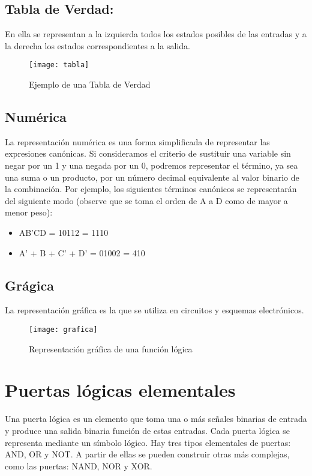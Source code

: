 \documentclass{article}
\begin{document}
            \subsection{\textbf{Tabla de Verdad:}} 
                En ella se representan a la izquierda todos los estados posibles de las entradas y a la derecha los estados correspondientes a la salida.\\
                \begin{figure}[htp]
                \centering
                \texttt{[image: tabla]}
                \caption{Ejemplo de una Tabla de Verdad}
                \end{figure}
             \subsection{\textbf{Numérica}}
                La representación numérica es una forma simplificada de representar las expresiones canónicas. Si consideramos el criterio de sustituir una variable sin negar por un 1 y una negada por un 0, podremos representar el término, ya sea una suma o un producto, por un número decimal equivalente al valor binario de la combinación. Por ejemplo, los siguientes términos canónicos se representarán del siguiente modo (observe que se toma el orden de A a D como de mayor a menor peso):\\
                \begin{itemize}
                \item AB’CD = 10112 = 1110
                \item A’ + B + C’ + D’ = 01002 = 410
                \end{itemize}
             \subsection{\textbf{Grágica}}
                La representación gráfica es la que se utiliza en circuitos y esquemas electrónicos.\\
                \begin{figure}[htp]
                \centering
                \texttt{[image: grafica]}
                \caption{Representación gráfica de una función lógica}
                \end{figure}
    \section{\large\textbf{Puertas lógicas elementales}}
        Una puerta lógica es un elemento que toma una o más señales binarias de entrada y produce una salida binaria función de estas entradas. Cada puerta lógica se representa mediante un símbolo lógico. Hay tres tipos elementales de puertas: AND, OR y NOT. A partir de ellas se pueden construir otras más complejas, como las puertas: NAND, NOR y XOR.
\end{document}
